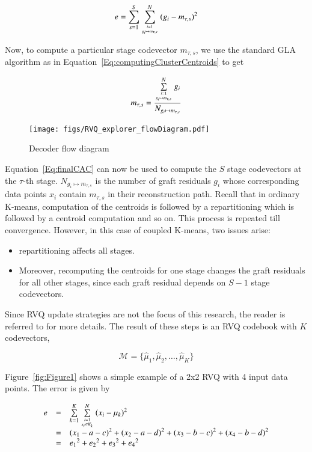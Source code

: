 \begin{equation}
e = \sum_{s=1}^S\sum\limits_{{i=1 \atop g_i \mapsto m_{\tau, s}}}^N{(g_i - m_{\tau, s})}^2
\end{equation} 

Now, to compute a particular stage codevector $m_{\tau, s}$, we use the standard GLA algorithm as in Equation~\ref{Eq:computingClusterCentroids} to get

\begin{equation}
m_{\tau, s} = \frac{\sum\limits_{{i=1 \atop g_i \mapsto m_{\tau, s}}}^N g_i}{N_{g_i \mapsto m_{\tau, s}}}
\label{Eq:finalCAC}
\end{equation}

\begin{figure}[ht]
\centering
\texttt{[image: figs/RVQ\_explorer\_flowDiagram.pdf]}
\caption{Decoder flow diagram}
\label{fig:RVQ_decoderFlowDiagram}
\end{figure}


Equation~\ref{Eq:finalCAC} can now be used to compute the $S$ stage codevectors at the $\tau$-th stage.  $N_{g_i \mapsto m_{\tau, s}}$ is the number of graft residuals $g_i$ whose corresponding data points $x_i$ contain $m_{\tau, s}$ in their reconstruction path.  Recall that in ordinary K-means, computation of the centroids is followed by a repartitioning which is followed by a centroid computation and so on.  This process is repeated till convergence.  However, in this case of coupled K-means, two issues arise:

\begin{itemize}
\item repartitioning affects all stages.  
\item Moreover, recomputing the centroids for one stage changes the graft residuals for all other stages, since each graft residual depends on $S-1$ stage codevectors.  
\end{itemize}

Since RVQ update strategies are not the focus of this research, the reader is referred to  \cite{1996_JNL_AdvancesRVQ_Barnes} for more details.  The result of these steps is an RVQ codebook with $K$ codevectors,

\begin{equation}
\mathcal{M} = \{\hat{\mu}_1, \hat{\mu}_2, \ldots, \hat{\mu}_K\}
\end{equation}

Figure~\ref{fig:Figure1} shows a simple example of a 2x2 RVQ with 4 input data points.  The error is given by



\begin{equation}
\begin{array}{lllll}
e &=& \sum\limits_{k=1}^K \sum\limits_{{i=1 \atop x_i \in \mathcal{K}_k}}^N {(x_i - \mu_k)}^2 \\
&=& {(x_1 - a - c)}^2 + {(x_2- a - d)}^2 + {(x_3 - b - c)}^2 + {(x_4 - b - d)}^2\\
&=& {e_1}^2 + {e_2}^2 + {e_3}^2 + {e_4}^2
\end{array}
\end{equation}

